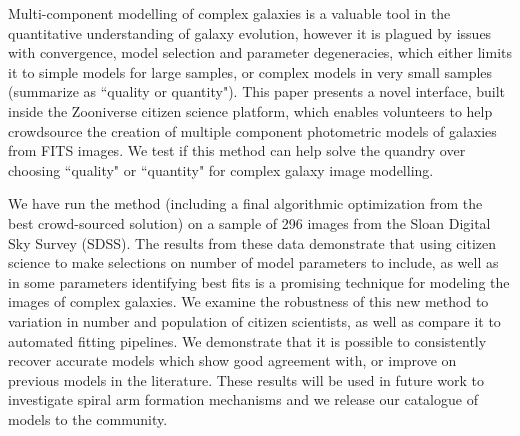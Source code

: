 \documentclass[../main.tex]{subfiles}
\begin{document}
Multi-component modelling of complex galaxies is a valuable tool in the quantitative understanding of galaxy evolution, however it is plagued by issues with convergence, model selection and parameter degeneracies, which either limits it to simple models for large samples, or complex models in very small samples (summarize as ``quality or quantity"). This paper presents a novel interface, built inside the Zooniverse citizen science platform, which enables volunteers to help crowdsource the creation of multiple component photometric models of galaxies from FITS images. We test if this method can help solve the quandry over choosing ``quality" or ``quantity" for complex galaxy image modelling.

We have run the method (including a final algorithmic optimization from the best crowd-sourced solution) on a sample of 296 images from the Sloan Digital Sky Survey (SDSS). The results from these data demonstrate that using citizen science to make selections on number of model parameters to include, as well as in some parameters identifying best fits is a promising technique for modeling the images of complex galaxies. We examine the robustness of this new method to variation in number and population of citizen scientists, as well as compare it to automated fitting pipelines. We demonstrate that it is possible to consistently recover accurate models which show good agreement with, or improve on previous models in the literature. These results will be used in future work to investigate spiral arm formation mechanisms and we release our catalogue of models to the community.
\end{document}
